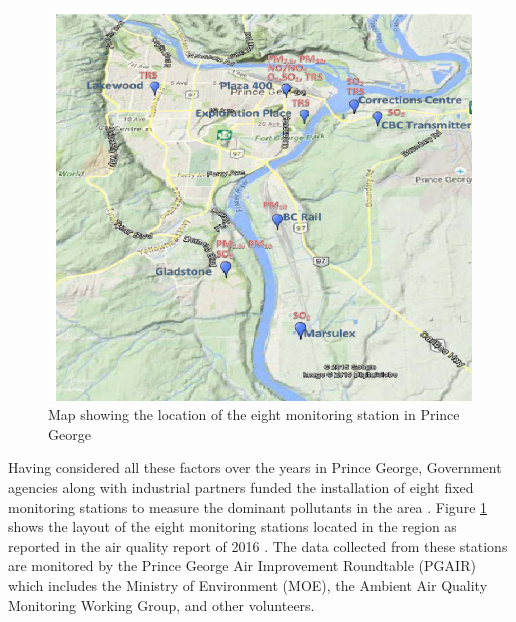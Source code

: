  \begin{figure}[h!]
  \begin{center}
  \includegraphics[scale=0.70]{./images/figure19.png}
  \end{center}
 
  \caption{Map showing the location of the eight monitoring station in Prince George \cite{Environment2016}}
  
  \label{Map}
\end{figure}
 
 Having considered all these factors over the years in Prince George, Government agencies along with industrial partners funded the installation of eight fixed monitoring stations to measure the dominant pollutants in the area \cite{Authority2011}. Figure \ref{Map} shows the layout of the eight monitoring stations located in the region as reported in the air quality report of 2016 \cite{Environment2016}. The data collected from these stations are monitored by the Prince George Air Improvement Roundtable (PGAIR)  which includes the Ministry of Environment (MOE), the Ambient Air Quality Monitoring Working Group, and other volunteers.
 
